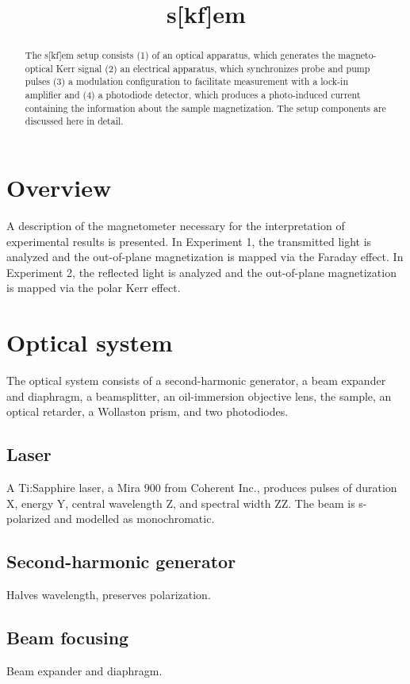 \documentclass{article}
\title{s[kf]em}
\begin{document}
\maketitle
\begin{abstract}
The s[kf]em setup consists (1) of an optical apparatus, which generates the magneto-optical Kerr signal (2) an electrical apparatus, which synchronizes probe and pump pulses (3) a modulation configuration to facilitate measurement with a lock-in amplifier and (4) a photodiode detector, which produces a photo-induced current containing the information about the sample magnetization. The setup components are discussed here in detail. 
\end{abstract}
\section{Overview}
A description of the magnetometer necessary for the interpretation of experimental results is presented.\cite{SKEM_Tamaru, SKEM_Back} In Experiment 1, the transmitted light is analyzed and the out-of-plane magnetization is mapped via the Faraday effect. In Experiment 2, the reflected light is analyzed and the out-of-plane magnetization is mapped via the polar Kerr effect.
\section{Optical system}
The optical system consists of a second-harmonic generator, a beam expander and diaphragm, a beamsplitter, an oil-immersion objective lens, the sample, an optical retarder, a Wollaston prism, and two photodiodes.

\subsection{Laser}
A Ti:Sapphire laser, a Mira 900 from Coherent Inc., produces pulses of duration X, energy Y, central wavelength Z, and spectral width ZZ. The beam is s-polarized and modelled as monochromatic.

\subsection{Second-harmonic generator}
Halves wavelength, preserves polarization.

\subsection{Beam focusing}
Beam expander and diaphragm.
\end{document}
